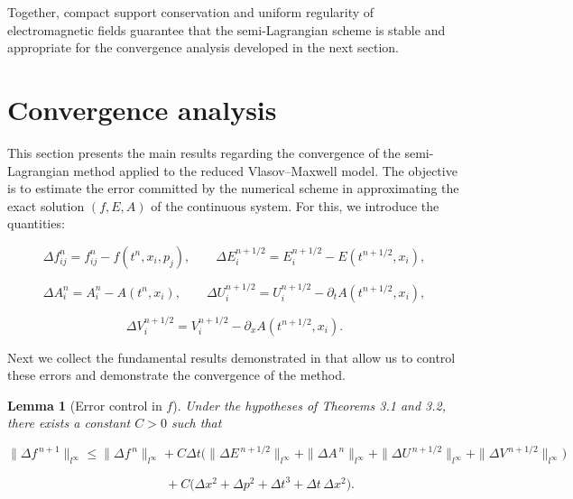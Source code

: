 \documentclass[11pt,a4paper,twoside,pdf]{article}
\numberwithin{equation}{section}
\newtheorem{lemma}[theorem]{Lemma}
\begin{document}
Together, compact support conservation and uniform regularity of electromagnetic fields guarantee that the semi-Lagrangian scheme is stable and appropriate for the convergence analysis developed in the next section.



\newpage
\section{Convergence analysis}

This section presents the main results regarding the convergence of the semi-Lagrangian method applied to the reduced Vlasov--Maxwell model. The objective is to estimate the error committed by the numerical scheme in approximating the exact solution $(f,E,A)$ of the continuous system. For this, we introduce the quantities:


\[
\Delta f^n_{ij} = f^n_{ij} - f(t^n,x_i,p_j), \qquad
\Delta E^{n+1/2}_i = E^{n+1/2}_i - E(t^{n+1/2},x_i),
\]




\[
\Delta A^n_i = A^n_i - A(t^n,x_i), \qquad
\Delta U^{n+1/2}_i = U^{n+1/2}_i - \partial_t A(t^{n+1/2},x_i),
\]




\[
\Delta V^{n+1/2}_i = V^{n+1/2}_i - \partial_x A(t^{n+1/2},x_i).
\]



Next we collect the fundamental results demonstrated in \cite{bostan2009convergence} that allow us to control these errors and demonstrate the convergence of the method.\\




\begin{lemma}[Error control in $f$]
Under the hypotheses of Theorems 3.1 and 3.2, there exists a constant $C>0$ such that


\[
\|\Delta f^{\,n+1}\|_{l^\infty}
\le \|\Delta f^{\,n}\|_{l^\infty}
+ C\Delta t\big(
\|\Delta E^{\,n+1/2}\|_{l^\infty}
+ \|\Delta A^{\,n}\|_{l^\infty}
+ \|\Delta U^{\,n+1/2}\|_{l^\infty}
+ \|\Delta V^{\,n+1/2}\|_{l^\infty}
\big)
\]




\[
\qquad\qquad
+ C\big(\Delta x^2 + \Delta p^2 + \Delta t^3 + \Delta t\,\Delta x^2\big).
\]


\end{lemma}
\end{document}
